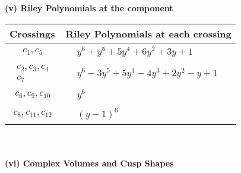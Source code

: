 \documentclass[1p]{elsarticle_modified}
\theoremstyle{definition}
\begin{document}
\newpage\renewcommand{\arraystretch}{1}
\flushleft \textbf{(v) Riley Polynomials at the component}\newline \\
\begin{tabular}{m{50pt}|m{274pt}}
Crossings & \hspace{64pt}Riley Polynomials at each crossing \\
\hline $$\begin{aligned}c_{1},c_{5}\end{aligned}$$&$\begin{aligned}
&y^6+y^5+5 y^4+6 y^2+3 y+1
\end{aligned}$\\
\hline $$\begin{aligned}c_{2},c_{3},c_{4}\\c_{7}\end{aligned}$$&$\begin{aligned}
&y^6-3 y^5+5 y^4-4 y^3+2 y^2- y+1
\end{aligned}$\\
\hline $$\begin{aligned}c_{6},c_{9},c_{10}\end{aligned}$$&$\begin{aligned}
&y^6
\end{aligned}$\\
\hline $$\begin{aligned}c_{8},c_{11},c_{12}\end{aligned}$$&$\begin{aligned}
&(y-1)^6
\end{aligned}$\\
\hline
\end{tabular}\\~\\
\newpage\flushleft \textbf{(vi) Complex Volumes and Cusp Shapes}
\end{document}
